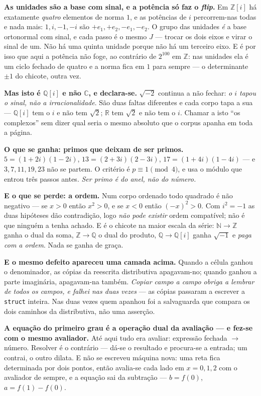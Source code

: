 \documentclass[11pt]{article}
\newcommand{\code}[1]{\texttt{\small #1}}
\theoremstyle{plain}
\theoremstyle{remark}
\begin{document}
\begin{itemize}
\textbf{As unidades são a base com sinal, e a potência só faz o \emph{flip}.} Em
$\mathbb{Z}[i]$ há exatamente \emph{quatro} elementos de norma $1$, e as potências de $i$
percorrem-nas todas e nada mais: $1, i, -1, -i$ são $+e_1, +e_2, -e_1, -e_2$. O grupo das unidades
\emph{é} a base ortonormal com sinal, e cada passo é o mesmo $J$ --- trocar os dois eixos e virar
o sinal de um. Não há uma quinta unidade porque não há um terceiro eixo. E é por isso que aqui a
potência não foge, ao contrário de $2^{100}$ em $\mathbb{Z}$: nas unidades ela é um ciclo fechado
de quatro e a norma fica em $1$ para sempre --- o determinante $\pm 1$ do chicote, outra vez.

\textbf{Mas isto é $\mathbb{Q}[i]$ e não $\mathbb{C}$, e declara-se.} $\sqrt{-2}$ continua a não
fechar: \emph{o $i$ tapou o sinal, não a irracionalidade}. São duas faltas diferentes e cada corpo
tapa a sua --- $\mathbb{Q}[i]$ tem o $i$ e não tem $\sqrt 2$; $\mathbb{R}$ tem $\sqrt 2$ e não tem
o $i$. Chamar a isto ``os complexos'' sem dizer qual seria o mesmo absoluto que o corpus apanha em
toda a página.

\textbf{O que se ganha: primos que deixam de ser primos.} $5 = (1+2i)(1-2i)$,
$13 = (2+3i)(2-3i)$, $17 = (1+4i)(1-4i)$ --- e $3, 7, 11, 19, 23$ não se partem. O critério é
$p \equiv 1 \pmod 4$, e usa o módulo que entrou três passos antes. \emph{Ser primo é do anel, não
do número.}

\textbf{E o que se perde: a ordem.} Num corpo ordenado todo quadrado é não negativo --- se $x>0$
então $x^2>0$, e se $x<0$ então $(-x)^2>0$. Com $i^2 = -1$ as duas hipóteses dão contradição, logo
\emph{não pode existir} ordem compatível; não é que ninguém a tenha achado. E é o chicote na maior
escala da série: $\mathbb{N}\to\mathbb{Z}$ ganha o dual da soma, $\mathbb{Z}\to\mathbb{Q}$ o dual
do produto, $\mathbb{Q}\to\mathbb{Q}[i]$ ganha $\sqrt{-1}$ e \emph{paga com a ordem}. Nada se ganha
de graça.

\textbf{E o mesmo defeito apareceu uma camada acima.} Quando a célula ganhou o denominador, as
cópias da reescrita distributiva apagavam-no; quando ganhou a parte imaginária, apagavam-na
também. \emph{Copiar campo a campo obriga a lembrar de todos os campos, e falhei nas duas
vezes} --- as cópias passaram a escrever a \code{struct} inteira. Nas duas vezes quem apanhou foi
a salvaguarda que compara os dois caminhos da distributiva, não uma asserção.

\textbf{A equação do primeiro grau é a operação dual da avaliação --- e fez-se com o mesmo
avaliador.} Até aqui tudo era avaliar: expressão fechada $\to$ número. Resolver é o contrário ---
dá-se o resultado e procura-se a entrada; um contrai, o outro dilata. E não se escreveu máquina
nova: uma reta fica determinada por dois pontos, então avalia-se cada lado em $x = 0, 1, 2$ com o
avaliador de sempre, e a equação sai da subtração --- $b = f(0)$, $a = f(1)-f(0)$.


\end{itemize}
\end{document}
